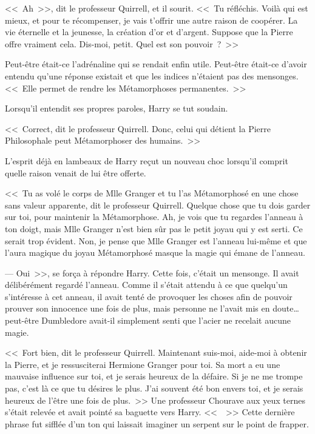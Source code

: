 <<~Ah~>>, dit le professeur Quirrell, et il sourit. <<~Tu réfléchis. Voilà qui est mieux, et pour te récompenser, je vais t'offrir une autre raison de coopérer. La vie éternelle et la jeunesse, la création d'or et d'argent. Suppose que la Pierre offre vraiment cela. Dis-moi, petit. Quel est son pouvoir~?~>>

Peut-être était-ce l'adrénaline qui se rendait enfin utile. Peut-être était-ce d'avoir entendu qu'une réponse existait et que les indices n'étaient pas des mensonges. <<~Elle permet de rendre les Métamorphoses permanentes.~>>

Lorsqu'il entendit ses propres paroles, Harry se tut soudain.

<<~Correct, dit le professeur Quirrell. Donc, celui qui détient la Pierre Philosophale peut Métamorphoser des humains.~>>

L'esprit déjà en lambeaux de Harry reçut un nouveau choc lorsqu'il comprit quelle raison venait de lui être offerte.

<<~Tu as volé le corps de Mlle Granger et tu l'as Métamorphosé en une chose sans valeur apparente, dit le professeur Quirrell. Quelque chose que tu dois garder sur toi, pour maintenir la Métamorphose. Ah, je vois que tu regardes l'anneau à ton doigt, mais Mlle Granger n'est bien sûr pas le petit joyau qui y est serti. Ce serait trop évident. Non, je pense que Mlle Granger est l'anneau lui-même et que l'aura magique du joyau Métamorphosé masque la magie qui émane de l'anneau.

--- Oui~>>, se força à répondre Harry. Cette fois, c'était un mensonge. Il avait délibérément regardé l'anneau. Comme il s'était attendu à ce que quelqu'un s'intéresse à cet anneau, il avait tenté de provoquer les choses afin de pouvoir prouver son innocence une fois de plus, mais personne ne l'avait mis en doute… peut-être Dumbledore avait-il simplement senti que l'acier ne recelait aucune magie.

<<~Fort bien, dit le professeur Quirrell. Maintenant suis-moi, aide-moi à obtenir la Pierre, et je ressusciterai Hermione Granger pour toi. Sa mort a eu une mauvaise influence sur toi, et je serais heureux de la défaire. Si je ne me trompe pas, c'est là ce que tu désires le plus. J'ai souvent été bon envers toi, et je serais heureux de l'être une fois de plus.~>> Une professeur Chourave aux yeux ternes s'était relevée et avait pointé sa baguette vers Harry. <<~~>> Cette dernière phrase fut sifflée d'un ton qui laissait imaginer un serpent sur le point de frapper.

